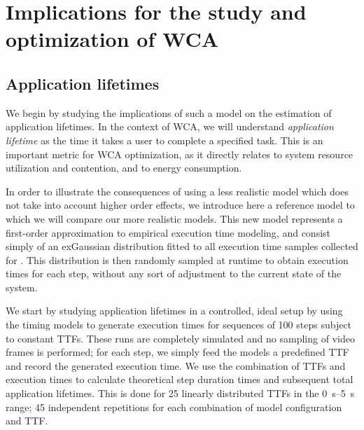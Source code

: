 \section{Implications for the study and optimization of \acs{WCA}}\label{sec:implications}

\subsection{Application lifetimes}

We begin by studying the implications of such a model on the estimation of application lifetimes.
In the context of \ac{WCA}, we will understand \emph{application lifetime} as the time it takes a user to complete a specified task.
This is an important metric for \ac{WCA} optimization, as it directly relates to system resource utilization and contention, and to energy consumption.

In order to illustrate the consequences of using a less realistic model which does not take into account higher order effects, we introduce here a reference model to which we will compare our more realistic models.
This new model represents a first-order approximation to empirical execution time modeling, and consist simply of an \ac{exGaussian} distribution fitted to all execution time samples collected for \textcite{olguinmunoz:impact2021}.
This distribution is then randomly sampled at runtime to obtain execution times for each step, without any sort of adjustment to the current state of the system.

We start by studying application lifetimes in a controlled, ideal setup by using the timing models to generate execution times for sequences of \num{100} steps subject to constant \acp{TTF}.
These runs are completely simulated and no sampling of video frames is performed; for each step, we simply feed the models a predefined \ac{TTF} and record the generated execution time.
We use the combination of \acp{TTF} and execution times to calculate theoretical step duration times and subsequent total application lifetimes.
This is done for \num{25} linearly distributed \acp{TTF} in the \SIrange[]{0}{5}{\second} range; \num{45} independent repetitions for each combination of model configuration and \ac{TTF}.

